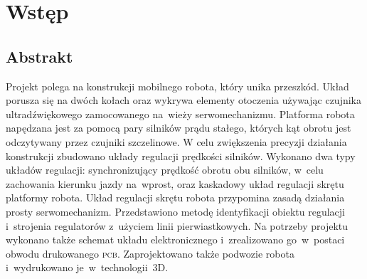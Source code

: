 \documentclass[11pt]{article}
\begin{document}
\newpage
{}
\tableofcontents

\section{Wstęp}

\subsection{Abstrakt}
Projekt polega na konstrukcji mobilnego robota, który unika przeszkód.
Układ porusza się na dwóch kołach oraz wykrywa elementy otoczenia używając czujnika ultradźwiękowego zamocowanego na~wieży serwomechanizmu.
Platforma robota napędzana jest za pomocą pary silników prądu stałego, których kąt obrotu jest odczytywany przez czujniki szczelinowe.
W celu zwiększenia precyzji działania konstrukcji zbudowano układy regulacji prędkości silników.
Wykonano dwa typy układów regulacji: synchronizujący prędkość obrotu obu silników, w~celu zachowania kierunku jazdy na~wprost, oraz kaskadowy układ regulacji skrętu platformy robota.
Układ regulacji skrętu robota przypomina zasadą działania prosty serwomechanizm.
Przedstawiono metodę identyfikacji obiektu regulacji i~strojenia regulatorów z~użyciem linii pierwiastkowych.
Na potrzeby projektu wykonano także schemat układu elektronicznego i~zrealizowano go~w~postaci obwodu drukowanego \textsc{pcb}.
Zaprojektowano także podwozie robota i~wydrukowano je~w~technologii~3D.
\end{document}
